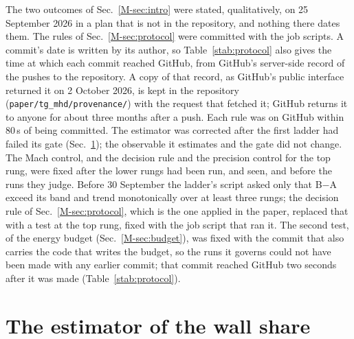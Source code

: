 \documentclass[aip,pop,reprint,amsmath,amssymb,superscriptaddress,floatfix]{revtex4-2}
\begin{document}
The two outcomes of Sec.~\ref{M-sec:intro} were stated, qualitatively, on 25 September
2026 in a plan that is not in the repository, and nothing there dates them. The rules
of Sec.~\ref{M-sec:protocol} were committed with the job scripts. A commit's date is
written by its author, so Table~\ref{stab:protocol} also gives the time at which each
commit reached GitHub, from GitHub's server-side record of the pushes to the
repository. A copy of that record, as GitHub's public interface returned it on
2 October 2026, is kept in the repository (\texttt{paper/tg\_mhd/provenance/}) with
the request that fetched it; GitHub returns it to anyone for about three months after
a push. Each rule was on GitHub within $80$\,s of being committed. The estimator was
corrected after the first ladder had failed its gate (Sec.~\ref{s:estimator}); the
observable it estimates and the gate did not change. The Mach control, and the
decision rule and the precision control for the top rung, were fixed after the lower
rungs had been run, and seen, and before the runs they judge. Before 30 September the ladder's script asked
only that B$-$A exceed its band and trend monotonically over at least three rungs;
the decision rule of Sec.~\ref{M-sec:protocol}, which is the one applied in the
paper, replaced that with a test at the top rung, fixed with the job script that ran
it. The second test, of the energy budget (Sec.~\ref{M-sec:budget}), was fixed with
the commit that also carries the code that writes the budget, so the runs it governs
could not have been made with any earlier commit; that commit reached GitHub two
seconds after it was made (Table~\ref{stab:protocol}).

\begin{table}
\caption{\label{stab:protocol}When each rule was fixed: the commit, its time by the
author's clock, and the time at which it reached GitHub by GitHub's push record, on
the same day. All times UTC, 2026.}
\begin{ruledtabular}

\end{ruledtabular}
\end{table}

\section{The estimator of the wall share}
\label{s:estimator}
\end{document}
